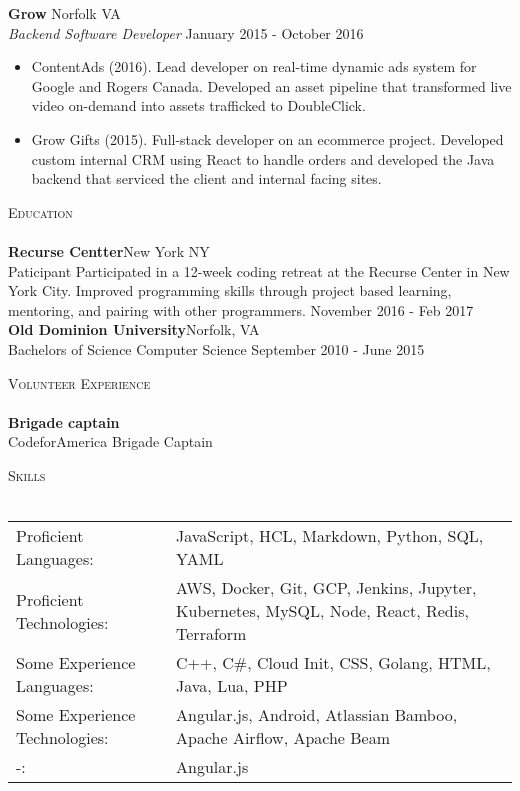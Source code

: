 \documentclass[a4paper]{article}
\newcommand{\lineunder} {
    \vspace*{-8pt} \\
    \hspace*{-18pt} \hrulefill \\
}
\newcommand{\header} [1] {
    {\hspace*{-18pt}\vspace*{6pt} \textsc{#1}}
    \vspace*{-6pt} \lineunder
}
\begin{document}
\textbf{Grow} \hfill Norfolk VA\\
\textit{Backend Software Developer} \hfill January 2015 - October 2016\\
\vspace{-1mm}
\begin{itemize} \itemsep 1pt
	\item ContentAds (2016). Lead developer on real-time dynamic ads system for Google and Rogers Canada. Developed an asset pipeline that transformed live video on-demand into assets trafficked to DoubleClick.
	\item Grow Gifts (2015). Full-stack developer on an ecommerce project. Developed custom internal CRM using React to handle orders and developed the Java backend that serviced the client and internal facing sites.
\end{itemize}

\header{Education}
\textbf{Recurse Centter}\hfill New York NY\\
Paticipant Participated in a 12-week coding retreat at the Recurse Center in New York City. Improved programming skills through project based learning, mentoring, and pairing with other programmers. \hfill November 2016 - Feb 2017\\
\vspace{2mm}
\textbf{Old Dominion University}\hfill Norfolk, VA\\
Bachelors of Science Computer Science \hfill September 2010 - June 2015\\
\vspace{2mm}

\header{Volunteer Experience}
{\textbf{Brigade captain}}\\
CodeforAmerica Brigade Captain\\
\vspace*{2mm}

\header{Skills}
\begin{tabular}{ l l }
	Proficient Languages:         & JavaScript, HCL, Markdown, Python, SQL, YAML                                              \\
	Proficient Technologies:      & AWS, Docker, Git, GCP, Jenkins, Jupyter, Kubernetes, MySQL, Node, React, Redis, Terraform \\
	Some Experience Languages:    & C++, C\#, Cloud Init, CSS, Golang, HTML, Java, Lua, PHP                                   \\
	Some Experience Technologies: & Angular.js, Android, Atlassian Bamboo, Apache Airflow, Apache Beam                        \\
	-:                            & Angular.js                                                                                \\
\end{tabular}
\vspace{2mm}



\ 
\end{document}
